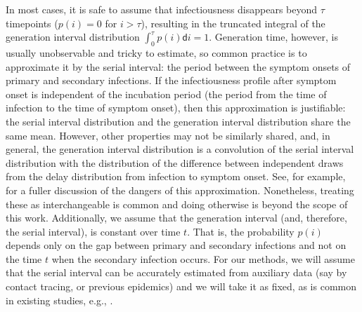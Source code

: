 \documentclass[10pt,letterpaper]{article}
\def\diff{\mathsf{d}}
\newcommand{\citep}[1]{\cite{#1}}
\begin{document}
In most cases, it is safe to assume that infectiousness disappears beyond 
$\tau$ timepoints ($p(i) = 0$ for $i > \tau$), resulting in the truncated integral 
of the generation interval distribution $\int_0^\tau p(i)\diff i = 1$.
Generation time, however, is usually unobservable and tricky to estimate, so
common practice is to approximate it by the serial interval: the period between
the symptom onsets of primary and secondary infections. If the infectiousness
profile after symptom onset is independent of the incubation period (the period
from the time of infection to the time of symptom onset), then this
approximation is justifiable: the serial interval distribution and the
generation interval distribution share the same mean. However, other properties
may not be similarly shared, and, in general, the generation interval
distribution is a convolution of the serial interval distribution with the
distribution of the difference between independent draws from the delay
distribution from infection to symptom onset. See, for example,
\cite{gostic2020practical} for a fuller discussion of the dangers of this
approximation. Nonetheless, treating these as interchangeable is common
\citep{cori2013new} and doing otherwise is beyond the scope of this work. 
Additionally, we assume that the generation interval (and, therefore, the 
serial interval), is constant over time $t$. That is, the probability $p(i)$ 
depends only on the gap between primary and secondary infections and not on 
the time $t$ when the secondary infection occurs. For our methods, we will 
assume that the serial interval can be accurately estimated from auxiliary 
data (say by contact tracing, or previous epidemics) and we will take it as 
fixed, as is common in existing studies, e.g., 
\cite{cori2013new,abry2020spatial,pascal2022nonsmooth}.
\end{document}
